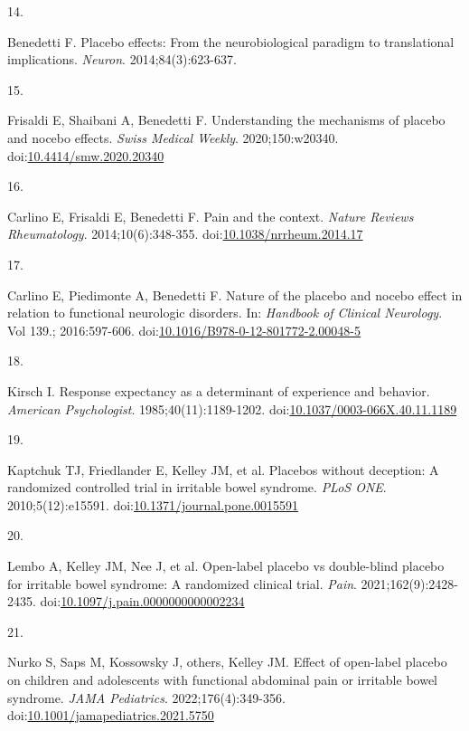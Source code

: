 \documentclass[
  11pt,
]{article}
\newlength{\cslhangindent}
\newlength{\csllabelwidth}
\newenvironment{CSLReferences}[2] %
 {\begin{list}{}{%
  \setlength{\itemindent}{0pt}
  \setlength{\leftmargin}{0pt}
  \setlength{\parsep}{0pt}
  \ifodd #1
   \setlength{\leftmargin}{\cslhangindent}
   \setlength{\itemindent}{-1\cslhangindent}
  \fi
  \setlength{\itemsep}{#2\baselineskip}}}
 {\end{list}}
\newcommand{\CSLLeftMargin}[1]{\parbox[t]{\csllabelwidth}{\strut#1\strut}}
\newcommand{\CSLRightInline}[1]{\parbox[t]{\linewidth - \csllabelwidth}{\strut#1\strut}}
\begin{document}
\begin{CSLReferences}{0}{1}
\CSLLeftMargin{14. }%
\CSLRightInline{Benedetti F. Placebo effects: From the neurobiological paradigm to translational implications. \emph{Neuron}. 2014;84(3):623-637.}

\CSLLeftMargin{15. }%
\CSLRightInline{Frisaldi E, Shaibani A, Benedetti F. Understanding the mechanisms of placebo and nocebo effects. \emph{Swiss Medical Weekly}. 2020;150:w20340. doi:\href{https://doi.org/10.4414/smw.2020.20340}{10.4414/smw.2020.20340}}

\CSLLeftMargin{16. }%
\CSLRightInline{Carlino E, Frisaldi E, Benedetti F. Pain and the context. \emph{Nature Reviews Rheumatology}. 2014;10(6):348-355. doi:\href{https://doi.org/10.1038/nrrheum.2014.17}{10.1038/nrrheum.2014.17}}

\CSLLeftMargin{17. }%
\CSLRightInline{Carlino E, Piedimonte A, Benedetti F. Nature of the placebo and nocebo effect in relation to functional neurologic disorders. In: \emph{Handbook of Clinical Neurology}. Vol 139.; 2016:597-606. doi:\href{https://doi.org/10.1016/B978-0-12-801772-2.00048-5}{10.1016/B978-0-12-801772-2.00048-5}}

\CSLLeftMargin{18. }%
\CSLRightInline{Kirsch I. Response expectancy as a determinant of experience and behavior. \emph{American Psychologist}. 1985;40(11):1189-1202. doi:\href{https://doi.org/10.1037/0003-066X.40.11.1189}{10.1037/0003-066X.40.11.1189}}

\CSLLeftMargin{19. }%
\CSLRightInline{{Kaptchuk TJ, Friedlander E, Kelley JM, et al.} Placebos without deception: A randomized controlled trial in irritable bowel syndrome. \emph{PLoS ONE}. 2010;5(12):e15591. doi:\href{https://doi.org/10.1371/journal.pone.0015591}{10.1371/journal.pone.0015591}}

\CSLLeftMargin{20. }%
\CSLRightInline{{Lembo A, Kelley JM, Nee J, et al.} Open-label placebo vs double-blind placebo for irritable bowel syndrome: A randomized clinical trial. \emph{Pain}. 2021;162(9):2428-2435. doi:\href{https://doi.org/10.1097/j.pain.0000000000002234}{10.1097/j.pain.0000000000002234}}

\CSLLeftMargin{21. }%
\CSLRightInline{{Nurko S, Saps M, Kossowsky J, others, Kelley JM}. Effect of open-label placebo on children and adolescents with functional abdominal pain or irritable bowel syndrome. \emph{JAMA Pediatrics}. 2022;176(4):349-356. doi:\href{https://doi.org/10.1001/jamapediatrics.2021.5750}{10.1001/jamapediatrics.2021.5750}}


\end{CSLReferences}
\end{document}
